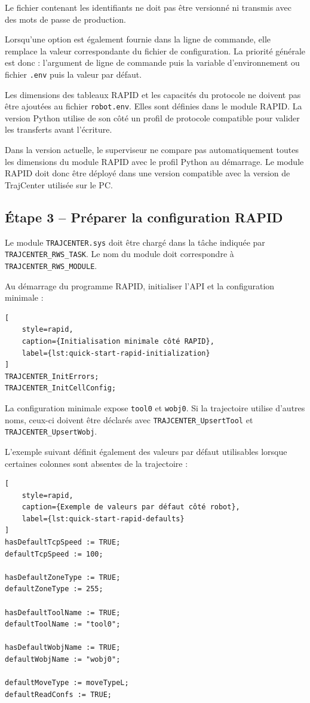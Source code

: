 \documentclass{rapportENSAM}
\begin{document}
Le fichier contenant les identifiants ne doit pas être versionné ni transmis avec des mots de passe de production.

Lorsqu'une option est également fournie dans la ligne de commande, elle remplace la valeur correspondante du fichier de configuration. La priorité générale est donc : l'argument de ligne de commande puis la variable d'environnement ou fichier \texttt{.env} puis la valeur par défaut.


Les dimensions des tableaux RAPID et les capacités du protocole ne doivent pas être ajoutées au fichier \texttt{robot.env}. Elles sont définies dans le module RAPID. La version Python utilise de son côté un profil de protocole compatible pour valider les transferts avant l'écriture.

Dans la version actuelle, le superviseur ne compare pas automatiquement toutes les dimensions du module RAPID avec le profil Python au démarrage. Le module RAPID doit donc être déployé dans une version compatible avec la version de TrajCenter utilisée sur le PC.


\subsection{Étape 3 -- Préparer la configuration RAPID}
\label{subsec:quick-start-rapid-configuration}

Le module \texttt{TRAJCENTER.sys} doit être chargé dans la tâche indiquée par \texttt{TRAJCENTER\_RWS\_TASK}. Le nom du module doit correspondre à \texttt{TRAJCENTER\_RWS\_MODULE}.

Au démarrage du programme RAPID, initialiser l'API et la configuration minimale :

\begin{lstlisting}[
    style=rapid,
    caption={Initialisation minimale côté RAPID},
    label={lst:quick-start-rapid-initialization}
]
TRAJCENTER_InitErrors;
TRAJCENTER_InitCellConfig;
\end{lstlisting}

La configuration minimale expose \texttt{tool0} et \texttt{wobj0}. Si la
trajectoire utilise d'autres noms, ceux-ci doivent être déclarés avec
\texttt{TRAJCENTER\_UpsertTool} et
\texttt{TRAJCENTER\_UpsertWobj}.

L'exemple suivant définit également des valeurs par défaut utilisables lorsque certaines colonnes sont absentes de la trajectoire :

\begin{lstlisting}[
    style=rapid,
    caption={Exemple de valeurs par défaut côté robot},
    label={lst:quick-start-rapid-defaults}
]
hasDefaultTcpSpeed := TRUE;
defaultTcpSpeed := 100;

hasDefaultZoneType := TRUE;
defaultZoneType := 255;

hasDefaultToolName := TRUE;
defaultToolName := "tool0";

hasDefaultWobjName := TRUE;
defaultWobjName := "wobj0";

defaultMoveType := moveTypeL;
defaultReadConfs := TRUE;
\end{lstlisting}
\end{document}
